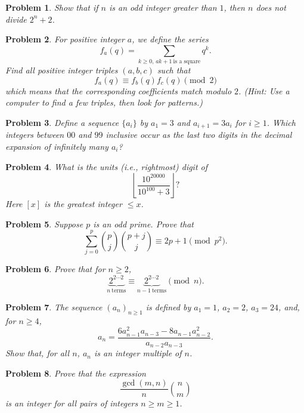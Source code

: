 \documentclass[12pt]{article}
\newtheorem{problem}{Problem}
\begin{document}
\begin{problem}
Show that if $n$ is an odd integer greater than $1$, then $n$ does not divide $2^n + 2$.
\end{problem}

\begin{problem}
For positive integer $a$, we define the series
\[
f_a(q) = \sum_{k \geq 0,\, a k + 1\ \text{is a square}} q^k.
\]
Find all positive integer triples $(a, b, c)$ such that
\[
f_a(q) \equiv f_b(q) f_c(q) \pmod{2}
\]
which means that the corresponding coefficients match modulo $2$. (Hint: Use a computer to find a few triples, then look for patterns.)
\end{problem}

\begin{problem}
Define a sequence $\{a_i\}$ by $a_1 = 3$ and $a_{i+1} = 3 a_i$ for $i \geq 1$. Which integers between $00$ and $99$ inclusive occur as the last two digits in the decimal expansion of infinitely many $a_i$?
\end{problem}

\begin{problem}
What is the units (i.e., rightmost) digit of
\[
\left\lfloor \frac{10^{20000}}{10^{100} + 3} \right\rfloor?
\]
Here $[x]$ is the greatest integer $\leq x$.
\end{problem}

\begin{problem}
Suppose $p$ is an odd prime. Prove that
\[
\sum_{j = 0}^p \binom{p}{j} \binom{p+j}{j} \equiv 2p + 1 \pmod{p^2}.
\]
\end{problem}

\begin{problem}
Prove that for $n \geq 2$,
\[
\underbrace{2^{2 \cdots 2}}_{n\ \text{terms}} \equiv \underbrace{2^{2 \cdots 2}}_{n-1\ \text{terms}} \pmod{n}.
\]
\end{problem}

\begin{problem}
The sequence $(a_n)_{n \geq 1}$ is defined by $a_1 = 1$, $a_2 = 2$, $a_3 = 24$, and, for $n \geq 4$,
\[
a_n = \frac{6a_{n-1}^2 a_{n-3} - 8 a_{n-1} a_{n-2}^2}{a_{n-2} a_{n-3}}.
\]
Show that, for all $n$, $a_n$ is an integer multiple of $n$.
\end{problem}

\begin{problem}
\textbf{\textcolor{red}{\heart}}
Prove that the expression
\[
\frac{\gcd(m, n)}{n} \binom{n}{m}
\]
is an integer for all pairs of integers $n \geq m \geq 1$.
\end{problem}
\end{document}
